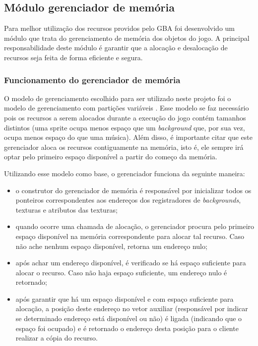 \subsection{Módulo gerenciador de memória}

Para melhor utilização dos recursos providos pelo GBA foi desenvolvido um módulo que trata do gerenciamento de memória dos objetos do jogo. A principal responsabilidade deste módulo é garantir que a alocação e desalocação de recursos seja feita de forma eficiente e segura.

    \subsubsection{Funcionamento do gerenciador de memória}

    O modelo de gerenciamento escolhido para ser utilizado neste projeto foi o modelo de gerenciamento com partições variáveis \cite{tanenbaum}. Esse modelo se faz necessário pois os recursos a serem alocados durante a execução do jogo contém tamanhos distintos (uma sprite ocupa menos espaço que um \textit{background} que, por sua vez, ocupa menos espaço do que uma música). Além disso, é importante citar que este gerenciador aloca os recursos contiguamente na memória, isto é, ele sempre irá optar pelo primeiro espaço disponível a partir do começo da memória.

    Utilizando esse modelo como base, o gerenciador funciona da seguinte maneira:

    \begin{itemize}
        \item o construtor do gerenciador de memória é responsável por inicializar todos os ponteiros correspondentes aos endereços dos registradores de \textit{backgrounds}, texturas e atributos das texturas;
        \item quando ocorre uma chamada de alocação, o gerenciador procura pelo primeiro espaço disponível na memória correspondente para alocar tal recurso. Caso não ache nenhum espaço disponível, retorna um endereço nulo;
        \item após achar um endereço disponível, é verificado se há espaço suficiente para alocar o recurso. Caso não haja espaço suficiente, um endereço nulo é retornado;
        \item após garantir que há um espaço disponível e com espaço suficiente para alocação, a posição deste endereço no vetor auxiliar (responsável por indicar se determinado endereço está disponível ou não) é ligada (indicando que o espaço foi ocupado) e é retornado o endereço desta posição para o cliente realizar a cópia do recurso.
    \end{itemize}

